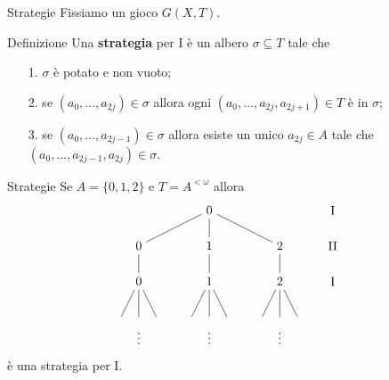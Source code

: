 \documentclass[aspectratio=43]{beamer}
\begin{document}
\begin{frame}{Strategie}
  Fissiamo un gioco \(G(X, T)\).
  \begin{block}{Definizione}
     Una \textbf{strategia} per \(\mathrm{I}\) è un albero \(\sigma \subseteq T\) tale che
    \begin{itemize}
    \item[1.] \(\sigma\) è potato e non vuoto;
    \item[2.] se \((a_0, \ldots, a_{2j}) \in \sigma\) allora ogni \((a_0, \ldots, a_{2j}, a_{2j+1}) \in T\) è in \(\sigma\);
    \item[3.] se \((a_0, \ldots, a_{2j - 1}) \in \sigma\) allora esiste un unico \(a_{2j} \in A\) tale che \((a_0, \ldots, a_{2j - 1}, a_{2j}) \in \sigma\).
    \end{itemize}
  \end{block}
\end{frame}

\begin{frame}{Strategie}
  Se \(A = \{0, 1, 2\}\) e \(T = A^{<\omega}\) allora
  \begin{equation*}
    \begin{tikzpicture}
      \node (1) at (0, 0){\(0\)};
      \node (11) at (-2, -1){\(0\)};
      \node (12) at (0, -1){\(1\)};
      \node (13) at (2, -1){\(2\)};
      \node (21) at (-2, -2){\(0\)};
      \node (22) at (0, -2){\(1\)};
      \node (23) at (2, -2){\(2\)};
      \node (dots) at (0, -3.5){\(\vdots\)};
      \node (dots) at (-2, -3.5){\(\vdots\)};
      \node (dots) at (2, -3.5){\(\vdots\)};

      \node (a) at (3.5, 0){\(\mathrm{I}\)};
      \node (a) at (3.5, -1){\(\mathrm{II}\)};
      \node (a) at (3.5, -2){\(\mathrm{I}\)};

      \draw[-] (1) -- (11) -- (21);
      \draw[-] (1) -- (12) -- (22);
      \draw[-] (1) -- (13) -- (23);

      \draw[-] (21) -- (-2.5, -3);
      \draw[-] (21) -- (-2, -3);
      \draw[-] (21) -- (-1.5, -3);

      \draw[-] (22) -- (-0.5, -3);
      \draw[-] (22) -- (0, -3);
      \draw[-] (22) -- (0.5, -3);

      \draw[-] (23) -- (1.5, -3);
      \draw[-] (23) -- (2, -3);
      \draw[-] (23) -- (2.5, -3);
    \end{tikzpicture}
  \end{equation*}
  è una strategia per \(\mathrm{I}\).
\end{frame}
\end{document}
